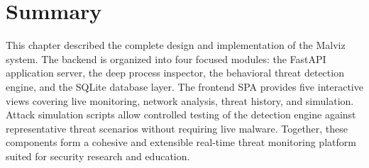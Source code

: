\section{Summary}

This chapter described the complete design and implementation of the Malviz system. The backend is organized into four focused modules: the FastAPI application server, the deep process inspector, the behavioral threat detection engine, and the SQLite database layer. The frontend SPA provides five interactive views covering live monitoring, network analysis, threat history, and simulation. Attack simulation scripts allow controlled testing of the detection engine against representative threat scenarios without requiring live malware. Together, these components form a cohesive and extensible real-time threat monitoring platform suited for security research and education.
